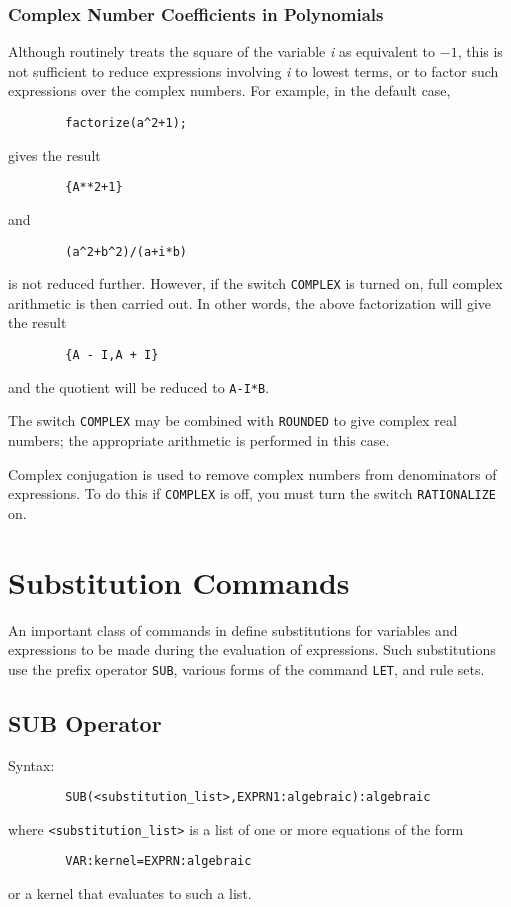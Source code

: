 \subsection{Complex Number Coefficients in Polynomials}
Although {\REDUCE} routinely treats the square of the variable {\em i\/} as
equivalent to $-1$, this is not sufficient to reduce expressions involving
{\em i\/} to lowest terms, or to factor such expressions over the complex
numbers.  For example, in the default case,
\begin{verbatim}
        factorize(a^2+1);
\end{verbatim}
gives the result
\begin{verbatim}
        {A**2+1}
\end{verbatim}
and
\begin{verbatim}
        (a^2+b^2)/(a+i*b)
\end{verbatim}
is not reduced further.  However, if the switch
{\tt COMPLEX} is turned on, full complex arithmetic is then
carried out.  In other words, the above factorization will give the result
\begin{verbatim}
        {A - I,A + I}
\end{verbatim}
and the quotient will be reduced to {\tt A-I*B}.

The switch {\tt COMPLEX} may be combined with {\tt ROUNDED} to give complex
real numbers; the appropriate arithmetic is performed in this case.

Complex conjugation is used to remove complex numbers from denominators of
expressions.  To do this if {\tt COMPLEX} is off, you must turn the switch
{\tt RATIONALIZE} on.

\chapter{Substitution Commands}
An important class of commands in {\REDUCE} define
substitutions for variables and expressions to be made during the
evaluation of expressions.  Such substitutions use the prefix operator
{\tt SUB}, various forms of the command {\tt LET}, and rule sets.

\section{SUB Operator}

Syntax:
\begin{verbatim}
        SUB(<substitution_list>,EXPRN1:algebraic):algebraic
\end{verbatim}
where {\tt <substitution\_list>} is a list of one or more equations of the
form
\begin{verbatim}
        VAR:kernel=EXPRN:algebraic
\end{verbatim}
or a kernel that evaluates to such a list.

